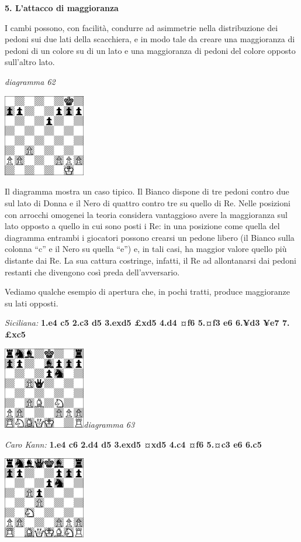 \documentclass[
]{article}
\begin{document}
\textbf{5. L'attacco di maggioranza}

I cambi possono, con facilità, condurre ad asimmetrie nella
distribuzione dei pedoni sui due lati della scacchiera, e in modo tale
da creare una maggioranza di pedoni di un colore su di un lato e una
maggioranza di pedoni del colore opposto sull'altro lato.

\emph{diagramma 62}

\includegraphics[width=1.40972in,height=1.40972in]{vertopal_109f12be458a423d8f3cc838880eaea2/media/image62.png}

Il diagramma mostra un caso tipico. Il Bianco dispone di tre pedoni
contro due sul lato di Donna e il Nero di quattro contro tre su quello
di Re. Nelle posizioni con arrocchi omogenei la teoria considera
vantaggioso avere la maggioranza sul lato opposto a quello in cui sono
posti i Re: in una posizione come quella del diagramma entrambi i
giocatori possono crearsi un pedone libero (il Bianco sulla colonna
``c'' e il Nero su quella ``e'') e, in tali casi, ha maggior valore
quello più distante dai Re. La sua cattura costringe, infatti, il Re ad
allontanarsi dai pedoni restanti che divengono così preda
dell'avversario.

Vediamo qualche esempio di apertura che, in pochi tratti, produce
maggioranze su lati opposti.

\emph{Siciliana:} \textbf{1.e4 c5 2.c3 d5 3.exd5 £xd5 4.d4 ¤f6 5.¤f3 e6
6.¥d3 ¥e7 7.£xc5}

\includegraphics[width=1.40972in,height=1.40972in]{vertopal_109f12be458a423d8f3cc838880eaea2/media/image63.png}\emph{diagramma
63}

\emph{Caro Kann:} \textbf{1.e4 c6 2.d4 d5 3.exd5 ¤xd5 4.c4 ¤f6 5.¤c3 e6
6.c5}

\includegraphics[width=1.40972in,height=1.40972in]{vertopal_109f12be458a423d8f3cc838880eaea2/media/image64.png}
\end{document}
